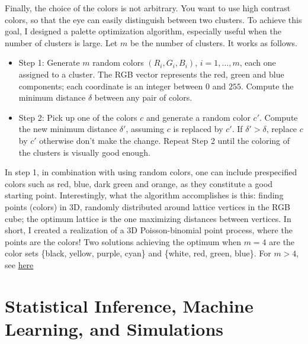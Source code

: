 \documentclass[10pt]{article}
\begin{document}
\noindent Finally, the choice of the colors is not arbitrary. You want to use high contrast colors, so that the eye can easily distinguish between two clusters. To achieve this goal, I designed a
\textcolor{index}{palette optimization} algorithm, especially useful when the number of clusters is large.  Let $m$ be the number of clusters. It works as follows.

\begin{itemize}
\item Step 1: Generate $m$ random colors $(R_i,G_i,B_i)$, $i=1,\dots,m$, each one assigned to a cluster. The RGB vector represents the red, green and blue components; each coordinate is an integer between $0$ and $255$. Compute the minimum distance $\delta$ between any pair of colors.
\item Step 2: Pick up one of the colors $c$ and generate a random color $c'$. Compute the new minimum distance $\delta'$, assuming $c$ is replaced by $c'$. If $\delta'>\delta$, replace
$c$ by $c'$ otherwise don't make the change. Repeat Step 2 until the coloring of the clusters is visually good enough.
\end{itemize}
In step 1, in combination with using random colors, one can include prespecified colors such as red, blue, dark green and orange, as they constitute a good starting point. Interestingly, what the algorithm accomplishes is this: finding points (colors) in 3D, randomly distributed around lattice vertices in the RGB cube; the optimum lattice is the one maximizing distances between
vertices. In short, I created a realization of a 3D Poisson-binomial point process, where the points are the colors! Two solutions achieving the optimum when $m=4$ are the color sets
 \{black, yellow, purple, cyan\} and \{white, red, green, blue\}. For $m>4$, see \href{https://mathoverflow.net/questions/415618/lattice-like-structure-with-maximum-spacing-between-vertices}{here}


\section{Statistical Inference, Machine Learning, and Simulations}\label{inference}
\end{document}
